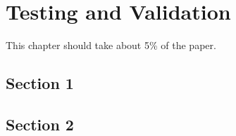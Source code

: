 \chapter{Testing and Validation}
\pagestyle{fancy}

{\noindent\color{blue}This chapter should take about 5\% of the paper.}

\section{Section 1}
\section{Section 2}

\lipsum[1-5]